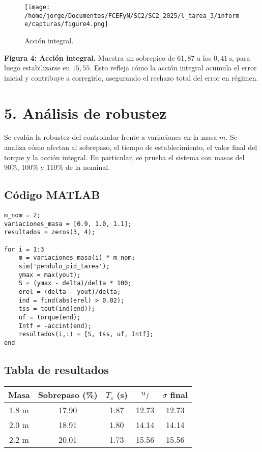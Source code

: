 \documentclass[11pt]{article}
\begin{document}
    \begin{figure}[ht]
          \centering
            \texttt{[image: /home/jorge/Documentos/FCEFyN/SC2/SC2\_2025/l\_tarea\_3/informe/capturas/figure4.png]}
              \caption{Acción integral.}
            \end{figure} 

\textbf{Figura 4: Acción integral.} Muestra un sobrepico de \( 61{,}87 \) a los \( 0{,}41 \ \text{s} \), para luego estabilizarse en \( 15{,}55 \). Esto refleja cómo la acción integral acumula el error inicial y contribuye a corregirlo, asegurando el rechazo total del error en régimen.


\section*{5. Análisis de robustez}
Se evalúa la robustez del controlador frente a variaciones en la masa \( m \). Se analiza cómo afectan al sobrepaso, el tiempo de establecimiento, el valor final del torque y la acción integral. En particular, se prueba el sistema con masas del 90\%, 100\% y 110\% de la nominal.

\subsection*{Código MATLAB}
\begin{lstlisting}
m_nom = 2;
variaciones_masa = [0.9, 1.0, 1.1];
resultados = zeros(3, 4);

for i = 1:3
    m = variaciones_masa(i) * m_nom;
    sim('pendulo_pid_tarea');
    ymax = max(yout);
    S = (ymax - delta)/delta * 100;
    erel = (delta - yout)/delta;
    ind = find(abs(erel) > 0.02);
    tss = tout(ind(end));
    uf = torque(end);
    Intf = -accint(end);
    resultados(i,:) = [S, tss, uf, Intf];
end
\end{lstlisting}

\subsection*{Tabla de resultados}
\begin{center}
\begin{tabular}{|c|c|c|c|c|}
\hline
\textbf{Masa} & \textbf{Sobrepaso (\%)} & \textbf{\(T_s\) (s)} & \textbf{\(u_f\)} & \textbf{\(\sigma\) final} \\
\hline
1.8 m & 17.90 & 1.87 & 12.73 & 12.73 \\
2.0 m & 18.91 & 1.80 & 14.14 & 14.14 \\
2.2 m & 20.01 & 1.73 & 15.56 & 15.56 \\
\hline
\end{tabular}
\end{center}
\end{document}
